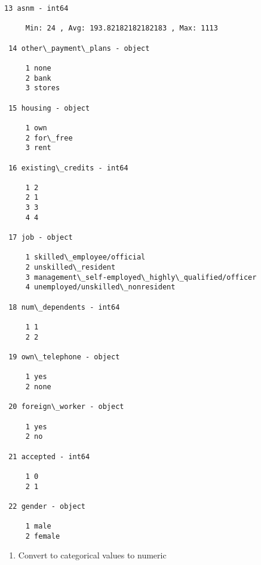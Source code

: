 \documentclass[11pt]{article}
\providecommand{\tightlist}{%
      \setlength{\itemsep}{0pt}\setlength{\parskip}{0pt}}
\begin{document}
\begin{Verbatim}[commandchars=\\\{\}]
 13 asnm - int64 

	 Min: 24 , Avg: 193.82182182182183 , Max: 1113

 14 other\_payment\_plans - object 

	 1 none
	 2 bank
	 3 stores

 15 housing - object 

	 1 own
	 2 for\_free
	 3 rent

 16 existing\_credits - int64 

	 1 2
	 2 1
	 3 3
	 4 4

 17 job - object 

	 1 skilled\_employee/official
	 2 unskilled\_resident
	 3 management\_self-employed\_highly\_qualified/officer
	 4 unemployed/unskilled\_nonresident

 18 num\_dependents - int64 

	 1 1
	 2 2

 19 own\_telephone - object 

	 1 yes
	 2 none

 20 foreign\_worker - object 

	 1 yes
	 2 no

 21 accepted - int64 

	 1 0
	 2 1

 22 gender - object 

	 1 male
	 2 female

    \end{Verbatim}

    \begin{enumerate}
\def\labelenumi{\arabic{enumi}.}
\setcounter{enumi}{3}
\tightlist
\item
  Convert to categorical values to numeric
\end{enumerate}
\end{document}
